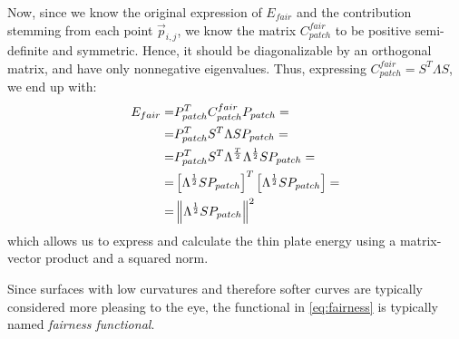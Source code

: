 Now, since we know the original expression of $E_{fair}$ and the contribution stemming from each point $\vec{p}_{i,j}$, we know the matrix $C_{patch}^{fair}$ to be positive semi-definite and symmetric. Hence, it should be diagonalizable by an orthogonal matrix, and have only nonnegative eigenvalues. Thus, expressing $C_{patch}^{fair} = S^T \Lambda S$, we end up with:
\begin{align}
E_{fair} =& P_{patch}^T C_{patch}^{fair} P_{patch} =\nonumber
\\
=&  P_{patch}^T S^T \Lambda S P_{patch} = \nonumber
\\
=& P_{patch}^T S^T \Lambda^{\frac{T}{2}}\Lambda^{\frac{1}{2}} S P_{patch} = \nonumber
\\
=& \left[\Lambda^{\frac{1}{2}} S P_{patch}\right]^T\left[\Lambda^{\frac{1}{2}} S P_{patch}\right] =\nonumber
\\
=& \norm{\Lambda^{\frac{1}{2}} S P_{patch}}^2
\label{eq:fairnessnorm}
\end{align}
which allows us to express and calculate the thin plate energy using a matrix-vector product and a squared norm.

Since surfaces with low curvatures and therefore softer curves are typically considered more pleasing to the eye, the functional in \autoref{eq:fairness} is typically named \emph{fairness functional}.

%
%
%
%


